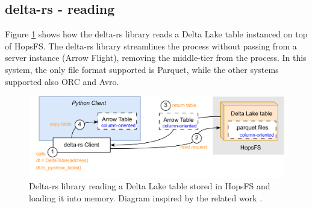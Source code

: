 \subsection{delta-rs - reading}
\label{subsec:back_sys_delta_read}

Figure \ref{fig:delta_read} shows how the delta-rs library reads a Delta Lake table instanced on top of \gls{HopsFS}. The delta-rs library streamlines the process without passing from a server instance (Arrow Flight), removing the middle-tier from the process. In this system, the only file format supported is Parquet, while the other systems supported also ORC and Avro.

\begin{figure}
    \begin{center}
      \includegraphics[width=\textwidth]{figures/2-background_and_related_work/delta_read.png}
    \end{center}
    \caption[delta-rs - read process]{Delta-rs library reading a Delta Lake table stored in \gls{HopsFS} and loading it into memory. Diagram inspired by the related work \cite{manfrediReducingReadWrite2024}.}
    \label{fig:delta_read}
\end{figure}